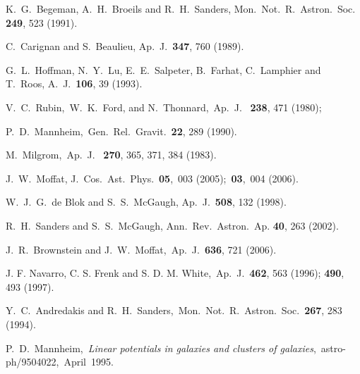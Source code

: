 \documentclass[preprint,aps]{revtex4}
\begin{document}
\begin{thebibliography}{}
 K.~G.~Begeman, A.~H.~Broeils  and R.~H.~Sanders, Mon.~Not.~R.~Astron.~Soc.~ {\bf 249}, 523 (1991).

 C.~Carignan and  S.~Beaulieu, Ap.~J.~{\bf 347}, 760 (1989).

	
 G.~L.~Hoffman, N.~Y.~Lu, E.~E.~Salpeter, B.~Farhat, C.~Lamphier and T.~Roos,  A.~J.~{\bf 106},  39 (1993).



 V.~C.~Rubin,~W.~K.~Ford, and N.~Thonnard,~Ap.~J.~ {\bf 238},  471 (1980); 





 P.~D.~Mannheim,~Gen.~Rel.~Gravit.~{\bf 22}, 289 (1990).



 M.~Milgrom,~Ap.~J.~ {\bf 270}, 365, 371, 384 (1983).





 J.~W.~Moffat, J.~Cos.~Ast.~Phys.~{\bf 05},~003 (2005);~{\bf 03},~004 (2006).





 W.~J.~G.~de Blok and S.~S.~McGaugh, Ap.~J.~{\bf 508}, 132 (1998).

 R.~H.~Sanders and S.~S.~McGaugh, Ann.~Rev.~Astron.~Ap. {\bf 40}, 263 (2002).


 J.~R.~Brownstein and  J.~W.~Moffat,~Ap.~J.~{\bf 636}, 721 (2006).

 J. F. Navarro, C. S. Frenk and S. D. M. White,~Ap.~J.~{\bf 462}, 563 (1996); {\bf 490}, 493 (1997).


 Y.~C.~Andredakis and R.~H.~Sanders,~Mon.~Not.~R.~Astron.~Soc.~{\bf 267}, 283 (1994).







 P.~D.~Mannheim,~{\it Linear potentials in galaxies and clusters of galaxies},~astro-ph/9504022,~April~1995.





\end{thebibliography}{}

\vfill\eject

\hoffset=-0.5in
\end{document}

